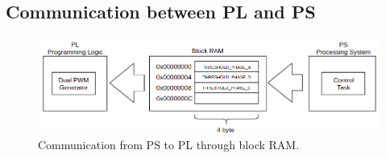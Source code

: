 \subsection{Communication between PL and PS}





\begin{figure}[H]
	\centering
	\includegraphics[width=1\linewidth]{pictures/software/com_pl_to_ps.png}
	\caption{Communication from PS to PL through block RAM.}
	\label{fig:com_pl_to_ps}
\end{figure}


